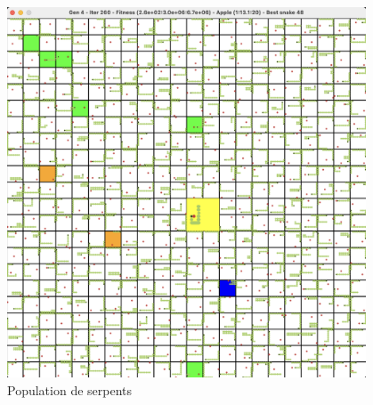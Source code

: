 \documentclass[10pt]{beamer}
\begin{document}
\begin{frame}
\begin{columns}[T]
\begin{column}{0.70\textwidth}
  \end{column}
  \begin{column}{0.26\textwidth}
  \begin{figure}
  \centering
  \vspace{-2.0cm}
  \includegraphics[width=1\textwidth]{snake_population.png}
  \vspace{-0.7cm}
  \caption*{\tiny Population de serpents}
  \end{figure}


\end{column}
\end{columns}
\end{frame}
\end{document}
